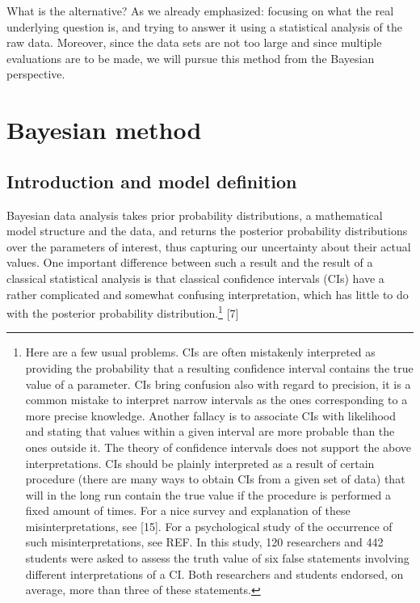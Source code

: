 \documentclass[
  12pt,
  dvipsnames,enabledeprecatedfontcommands]{scrartcl}
\begin{document}
What is the alternative? As we already emphasized: focusing on what the
real underlying question is, and trying to answer it using a statistical
analysis of the raw data. Moreover, since the data sets are not too
large and since multiple evaluations are to be made, we will pursue this
method from the Bayesian perspective.

\hypertarget{bayesian-method}{%
\section{Bayesian method}\label{bayesian-method}}

\hypertarget{introduction-and-model-definition}{%
\subsection{Introduction and model
definition}\label{introduction-and-model-definition}}

Bayesian data analysis takes prior probability distributions, a
mathematical model structure and the data, and returns the posterior
probability distributions over the parameters of interest, thus
capturing our uncertainty about their actual values. One important
difference between such a result and the result of a classical
statistical analysis is that classical confidence intervals (CIs) have a
rather complicated and somewhat confusing interpretation, which has
little to do with the posterior probability distribution.\footnote{Here
  are a few usual problems. CIs are often mistakenly interpreted as
  providing the probability that a resulting confidence interval
  contains the true value of a parameter. CIs bring confusion also with
  regard to precision, it is a common mistake to interpret narrow
  intervals as the ones corresponding to a more precise knowledge.
  Another fallacy is to associate CIs with likelihood and stating that
  values within a given interval are more probable than the ones outside
  it. The theory of confidence intervals does not support the above
  interpretations. CIs should be plainly interpreted as a result of
  certain procedure (there are many ways to obtain CIs from a given set
  of data) that will in the long run contain the true value if the
  procedure is performed a fixed amount of times. For a nice survey and
  explanation of these misinterpretations, see {[}15{]}. For a
  psychological study of the occurrence of such misinterpretations, see
  REF. In this study, 120 researchers and 442 students were asked to
  assess the truth value of six false statements involving different
  interpretations of a CI. Both researchers and students endorsed, on
  average, more than three of these statements.} {[}7{]}
\end{document}
